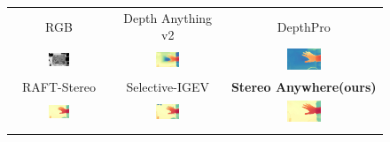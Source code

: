 \documentclass[10pt,twocolumn,letterpaper]{article}
\newcommand{\method}[0]{Stereo Anywhere\xspace}
\begin{document}
\begin{figure}[h]
\begin{tabular}{ccc}
        \small RGB &
        \small Depth Anything v2 \cite{depth_anything_v2} &
        \small DepthPro \cite{depthpro} \\
        \includegraphics[width=0.23\textwidth]{imgs/monotrap/rgb/13.jpg} & 
        \includegraphics[width=0.23\textwidth]{imgs/monotrap/mono/dav2/13.jpg}  &
        \includegraphics[width=0.23\textwidth]{imgs/monotrap/mono/depthpro/13.jpg} \\
        \small RAFT-Stereo \cite{lipson2021raft} &
        \small Selective-IGEV \cite{wang2024selective} &      
        \textbf{\method (ours)} \\
        \includegraphics[width=0.23\textwidth]{imgs/monotrap/stereo/RAFT-Stereo/13.jpg} &
        \includegraphics[width=0.23\textwidth]{imgs/monotrap/stereo/Selective/13.jpg} &
        \includegraphics[width=0.23\textwidth]{imgs/monotrap/ours/13.jpg} \\ \\


\end{tabular}
\end{figure}
\end{document}
